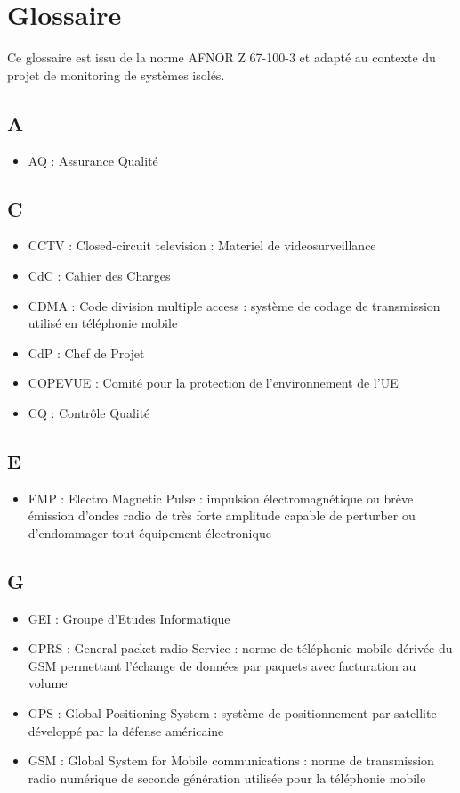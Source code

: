 \documentclass[a4paper]{article}
\begin{document}
\section{Glossaire}

Ce glossaire est issu de la norme AFNOR Z 67-100-3 et adapté au contexte du projet de monitoring de systèmes isolés.

\subsection{A}

\begin{itemize}
\item AQ : Assurance Qualité
\end{itemize}

\subsection{C}

\begin{itemize}
\item CCTV : Closed-circuit television : Materiel de videosurveillance
\item CdC : Cahier des Charges
\item CDMA : Code division multiple access : système de codage de transmission utilisé en téléphonie mobile
\item CdP : Chef de Projet
\item COPEVUE : Comité pour la protection de l’environnement de l’UE
\item CQ : Contrôle Qualité
\end{itemize}

\subsection{E}

\begin{itemize}
\item EMP : Electro Magnetic Pulse : impulsion électromagnétique ou brève émission d’ondes radio
de très forte amplitude capable de perturber ou d’endommager
tout équipement électronique
\end{itemize}

\subsection{G}

\begin{itemize}
\item GEI : Groupe d’Etudes Informatique
\item GPRS : General packet radio Service : norme de téléphonie mobile dérivée du GSM permettant
l’échange de données par paquets avec facturation au volume
\item GPS : Global Positioning System : système de positionnement par satellite développé par la
défense américaine
\item GSM : Global System for Mobile communications :
norme de transmission radio numérique de seconde génération
utilisée pour la téléphonie mobile
\end{itemize}
\end{document}
